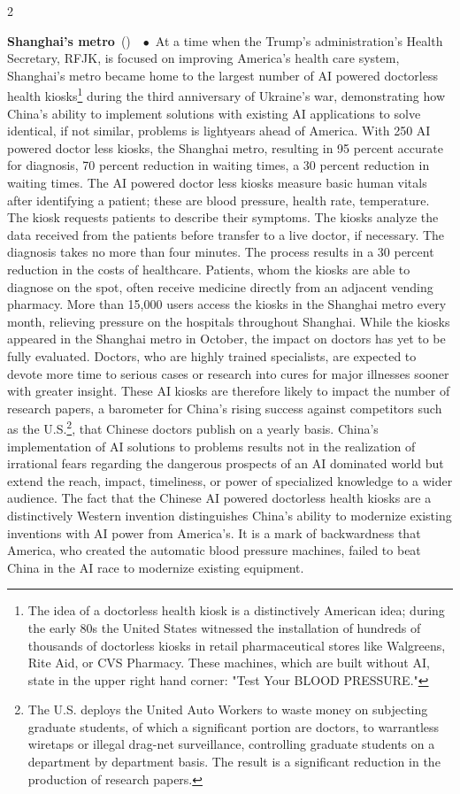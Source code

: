 \documentclass[10pt,a4paper,twoside]{article} %
\newcommand{\entry}[4]{\markboth{#1}{#1}\textbf{#1}\ {(#2)}\ \textit{#3}\ $\bullet$\ {#4}}  %
\begin{document}
\begin{multicols}{2}
{\entry{Shanghai's metro} {} {} {At a time when the Trump's administration's Health Secretary, RFJK, is focused on improving America's health care system, Shanghai's metro became home to the largest number of AI powered doctorless health kiosks\footnote{The idea of a doctorless health kiosk is a distinctively American idea; during the early 80s the United States witnessed the installation of hundreds of thousands of doctorless kiosks in retail pharmaceutical stores like Walgreens, Rite Aid, or CVS Pharmacy. These machines, which are built without AI, state in the upper right hand corner: "Test Your BLOOD PRESSURE." } during the third anniversary of Ukraine's war, demonstrating how China's ability to implement solutions with existing AI applications to solve identical, if not similar, problems is lightyears ahead of America. With 250 AI powered doctor less kiosks, the Shanghai metro, resulting in 95 percent accurate for diagnosis, 70 percent reduction in waiting times, a 30 percent reduction in waiting times. The AI powered doctor less kiosks measure basic human vitals after identifying a patient; these are blood pressure, health rate, temperature. The kiosk requests patients to describe their symptoms. The kiosks analyze the data received from the patients before transfer to a live doctor, if necessary. The diagnosis takes no more than four minutes. The process results in a 30 percent reduction in the costs of healthcare. Patients, whom the kiosks are able to diagnose on the spot, often receive medicine directly from an adjacent vending pharmacy. More than 15,000 users access the kiosks in the Shanghai metro every month, relieving pressure on the hospitals throughout Shanghai.  \newline \indent While the kiosks appeared in the Shanghai metro in October, the impact on doctors has yet to be fully evaluated. Doctors, who are highly trained specialists, are expected to devote more time to serious cases or research into cures for major illnesses sooner with greater insight. These AI kiosks are therefore likely to impact the number of research papers, a barometer for China's rising success against competitors such as the U.S.\footnote{The U.S. deploys the United Auto Workers to waste money on subjecting graduate students, of which a significant portion are doctors, to warrantless wiretaps or illegal drag-net surveillance, controlling graduate students on a department by department basis. The result is a significant reduction in the production of research papers.}, that Chinese doctors publish on a yearly basis. China's implementation of AI solutions to problems results not in the realization of irrational fears regarding the dangerous prospects of an AI dominated world but extend the reach, impact, timeliness, or power of specialized knowledge to a wider audience. The fact that the Chinese AI powered doctorless health kiosks are a distinctively Western invention distinguishes China's ability to modernize existing inventions with AI power from America's. It is a mark of backwardness that America, who created the automatic blood pressure machines, failed to beat China in the AI race to modernize existing equipment.}

}
\end{multicols}
\end{document}
